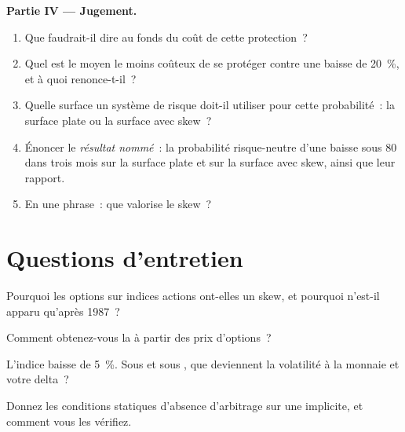 \begin{problem}
\medskip\noindent\textbf{Partie IV --- Jugement.}
\begin{enumerate}[resume]
\item Que faudrait-il dire au fonds du coût de cette protection~?
\item Quel est le moyen le moins coûteux de se protéger contre une baisse de 20~\%, et à quoi renonce-t-il~?
\item Quelle surface un système de risque doit-il utiliser pour cette probabilité~: la surface plate ou la surface avec skew~?
\item Énoncer le \emph{résultat nommé}~: la probabilité risque-neutre d'une baisse sous 80 dans trois
mois sur la surface plate et sur la surface avec skew, ainsi que leur rapport.
\item En une phrase~: que valorise le skew~?
\end{enumerate}
\end{problem}

\section{Questions d'entretien}

\begin{interviewq}\label{iq:dv:implied-volatility-and-its-surface:1}
Pourquoi les options sur indices actions ont-elles un skew, et pourquoi n'est-il apparu qu'après 1987~?
\end{interviewq}

\begin{interviewq}\label{iq:dv:implied-volatility-and-its-surface:2}
Comment obtenez-vous la  à partir des prix d'options~?
\end{interviewq}

\begin{interviewq}\label{iq:dv:implied-volatility-and-its-surface:3}
L'indice baisse de 5~\%. Sous  et sous
, que deviennent la volatilité à la monnaie et votre delta~?
\end{interviewq}

\begin{interviewq}\label{iq:dv:implied-volatility-and-its-surface:4}
Donnez les conditions statiques d'absence d'arbitrage sur une 
implicite, et comment vous les vérifiez.
\end{interviewq}


